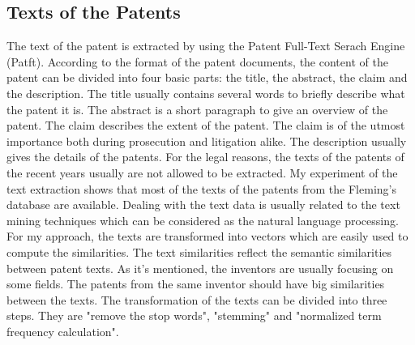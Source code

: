 \subsection{Texts of the Patents}
The text of the patent is extracted by using the Patent Full-Text Serach Engine (Patft).  According to the format of the patent documents, the content of the patent can be divided into four basic parts: the title, the abstract, the claim and the description. The title usually contains several words to briefly describe what the patent it is. The abstract is a short paragraph to give an overview of the patent. The claim describes the extent of the patent. The claim is of the utmost importance both during prosecution and litigation alike. The description usually gives the details of the patents. For the legal reasons, the texts of the patents of the recent years usually are not allowed to be extracted. My experiment of the text extraction shows that most of the texts of the patents from the Fleming's database are available. Dealing with the text data is usually related to the text mining techniques which can be considered as the natural language processing. For my approach, the texts are transformed into vectors which are easily used to compute the similarities. The text similarities  reflect the semantic similarities between patent texts. As it's mentioned, the inventors are usually focusing on some fields. The patents from the same inventor should have big similarities between the texts. The transformation of the texts can be divided into three steps. They are "remove the stop words", "stemming" and "normalized term frequency calculation". 

